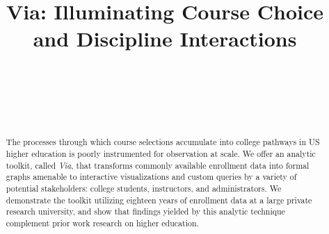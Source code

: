 \documentclass{sigchi}
\def\plaintitle{Via: Illuminating Course Choice and Discipline Interactions}
\begin{document}
\title{\plaintitle}

\author{%
  \\
  \\
  \\
  \\
}

\maketitle

\begin{abstract}
The processes through which course selections accumulate into college pathways in US higher education is poorly instrumented for observation at scale. We offer an analytic toolkit, called {\em Via}, that transforms commonly available enrollment data into formal graphs amenable to interactive visualizations and custom queries by a variety of potential stakeholders: college students, instructors, and administrators. We demonstrate the toolkit utilizing eighteen years of enrollment data at a large private research university, and show that findings yielded by this analytic technique complement prior work research on higher education.
 \end{abstract}




\end{document}
